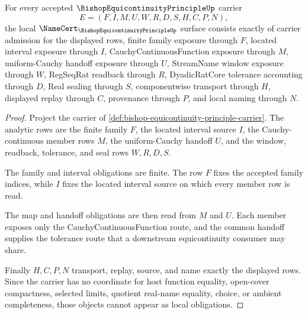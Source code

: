 \begin{theorem}
\label{thm:bishop-equicontinuity-principle-namecert-obligations}
For every accepted $\BishopEquicontinuityPrincipleUp$ carrier
$$
E=(F,I,M,U,W,R,D,S,H,C,P,N),
$$
the local $\NameCert_{\BishopEquicontinuityPrincipleUp}$ surface consists exactly of carrier admission for the displayed rows, finite family exposure through $F$, located interval exposure through $I$, CauchyContinuousFunction exposure through $M$, uniform-Cauchy handoff exposure through $U$, StreamName window exposure through $W$, RegSeqRat readback through $R$, DyadicRatCore tolerance accounting through $D$, Real sealing through $S$, componentwise transport through $H$, displayed replay through $C$, provenance through $P$, and local naming through $N$.
\end{theorem}
\begin{proof}
Project the carrier of \autoref{def:bishop-equicontinuity-principle-carrier}. The analytic rows are the finite family $F$, the located interval source $I$, the Cauchy-continuous member rows $M$, the uniform-Cauchy handoff $U$, and the window, readback, tolerance, and seal rows $W,R,D,S$.

The family and interval obligations are finite. The row $F$ fixes the accepted family indices, while $I$ fixes the located interval source on which every member row is read.

The map and handoff obligations are then read from $M$ and $U$. Each member exposes only the CauchyContinuousFunction route, and the common handoff supplies the tolerance route that a downstream equicontinuity consumer may share.

Finally $H,C,P,N$ transport, replay, source, and name exactly the displayed rows. Since the carrier has no coordinate for host function equality, open-cover compactness, selected limits, quotient real-name equality, choice, or ambient completeness, those objects cannot appear as local obligations.
\end{proof}

